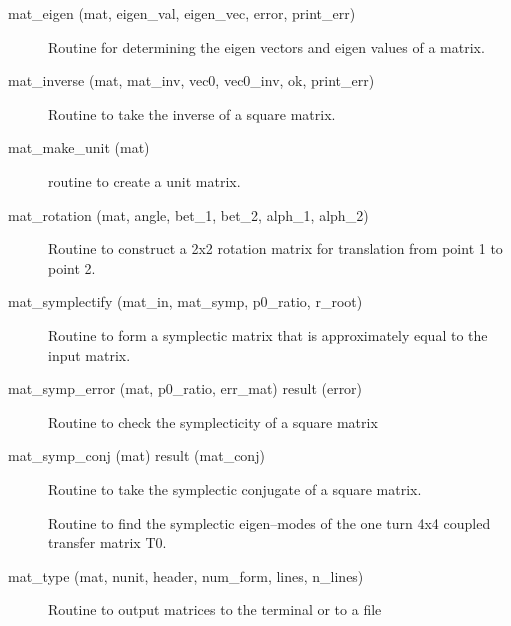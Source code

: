 \begin{description}

\label{r:mat.eigen}
\item[mat_eigen (mat, eigen_val, eigen_vec, error, print_err)] \Newline 
Routine for determining the eigen vectors and eigen values of a matrix.

\label{r:mat.inverse}
\item[mat_inverse (mat, mat_inv, vec0, vec0_inv, ok, print_err)] \Newline
Routine to take the inverse of a square matrix. 

\label{r:mat.make.unit}
\item[mat_make_unit (mat)] \Newline 
     routine to create a unit matrix.

\label{r:mat.rotation}
\item[mat_rotation (mat, angle, bet_1, bet_2, alph_1, alph_2)] \Newline 
     Routine to construct a 2x2 rotation matrix for translation from
     point 1 to point 2.

\label{r:mat.symplectify}
\item[mat_symplectify (mat_in, mat_symp, p0_ratio, r_root)] \Newline
Routine to form a symplectic matrix that is approximately equal to the input matrix. 

\label{r:mat.symp.error}
\item[mat_symp_error (mat, p0_ratio, err_mat) result (error)] \Newline
Routine to check the symplecticity of a square matrix 

\label{r:mat.symp.conj}
\item[mat_symp_conj (mat) result (mat_conj)] \Newline 
Routine to take the symplectic conjugate of a square matrix.

\label{r:mat.symp.decouple}
\item[\protect\parbox{6in}{
    mat_symp_decouple (t0, stat, u, v, \\
    \hspace*{1in} ubar, vbar, g, twiss1, twiss2, gamma, type_out) }] \Newline
Routine to find the symplectic eigen--modes of the one turn 4x4 coupled 
transfer matrix T0. 

\label{r:mat.type}
\item[mat_type (mat, nunit, header, num_form, lines, n_lines)] \Newline 
     Routine to output matrices to the terminal or to a file

\end{description}

